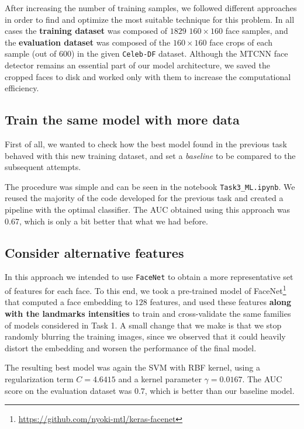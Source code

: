 \documentclass[11pt]{article}
\begin{document}
After increasing the number of training samples, we followed different approaches in order to find and optimize the most suitable technique for this problem. In all cases the \textbf{training dataset} was composed of \( 1829 \) \( 160\times 160 \) face samples, and the \textbf{evaluation dataset} was composed of the \( 160 \times 160 \) face crops of each sample (out of 600) in the given \texttt{Celeb-DF} dataset. Although the MTCNN face detector remains an essential part of our model architecture, we saved the cropped faces to disk and worked only with them to increase the computational efficiency.

\subsection*{Train the same model with more data}

First of all, we wanted to check how the best model found in the previous task behaved with this new training dataset, and set a \emph{baseline} to be compared to the subsequent attempts.

The procedure was simple and can be seen in the notebook \texttt{Task3\_ML.ipynb}. We reused the majority of the code developed for the previous task and created a pipeline with the optimal classifier. The AUC obtained using this approach was 0.67, which is only a bit better that what we had before.

\subsection*{Consider alternative features}

In this approach we intended to use \texttt{FaceNet} \citep{Schroff_2015} to obtain a more representative set of features for each face. To this end, we took a pre-trained model of FaceNet\footnote{\url{https://github.com/nyoki-mtl/keras-facenet}} that computed a face embedding to \( 128 \) features, and used these features \textbf{along with the landmarks intensities} to train and cross-validate the same families of models considered in Task 1. A small change that we make is that we stop randomly blurring the training images, since we observed that it could heavily distort the embedding and worsen the performance of the final model.

The resulting best model was again the SVM with RBF kernel, using a regularization term \( C = 4.6415 \) and a kernel parameter \( \gamma = 0.0167 \). The AUC score on the evaluation dataset was \( 0.7 \), which is better than our baseline model.
\end{document}
